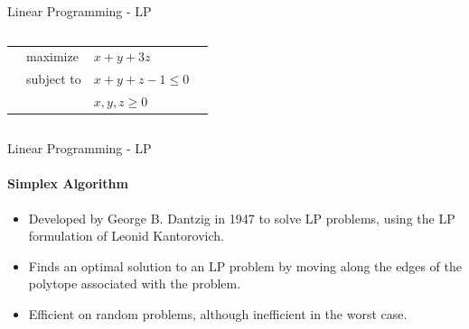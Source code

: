 \documentclass{beamer}
\renewcommand{\vec}{\mathbf}
\begin{document}
\begin{frame}{Linear Programming - LP}
\begin{columns}[T]
\begin{column}{0.5\textwidth}
				\small
				\begin{tabularx}{\textwidth}{X l l X}
					& maximize		& $x + y + 3z$		& \\
					& subject to	& $x+y+z-1\leq 0$	& \\
					&				& $x, y, z\geq 0$ &
				\end{tabularx}
			\end{column}
			
		\end{columns}
	\end{frame}

	\begin{frame}{Linear Programming - LP}
		\framesubtitle{Simplex Algorithm}
		\begin{itemize}
			\item Developed by George B. Dantzig in 1947 to solve LP problems, using the LP formulation of Leonid Kantorovich.
			\item Finds an optimal solution to an LP problem by moving along the edges of the polytope associated with the problem.
			\item Efficient on random problems, although inefficient in the worst case.
		\end{itemize}
	\end{frame}
%
\end{document}
